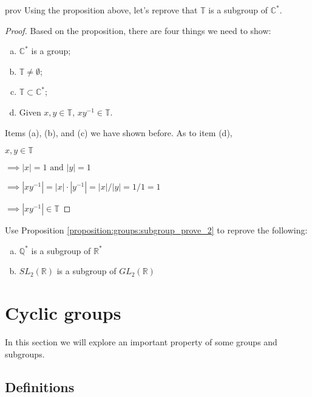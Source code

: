 \begin{example}{prov}
Using the proposition above, let's reprove that ${\mathbb T}$ is a subgroup of ${\mathbb C}^{\ast}$.

\begin{proof}
Based on the proposition, there are four things we need to show:
\begin{enumerate}[(a)]
\item
${\mathbb C}^{\ast}$ is a group; 
\item
${\mathbb T} \neq \emptyset$; 
\item
${\mathbb T} \subset {\mathbb C}^{\ast}$; 
\item
Given $x, y \in {\mathbb T}$, $xy^{-1} \in {\mathbb T}$.
\end{enumerate}

\noindent
Items (a), (b), and (c) we have shown before. As to item (d), 

$x, y \in {\mathbb T}$

$\implies |x|=1 \mbox{ and } |y|=1$

$\implies |xy^{-1}|= |x|\cdot|y^{-1}| = |x|/|y| = 1/1 = 1$

$\implies |xy^{-1}| \in {\mathbb T}$

\end{proof}
\end{example} 

\begin{exercise}{73}
Use Proposition \ref{proposition:groups:subgroup_prove_2} to reprove the following:
\begin{enumerate}[(a)]
\item
${\mathbb Q}^*$ is a subgroup of ${\mathbb R}^*$
\item
$SL_2( {\mathbb R})$ is a subgroup of $GL_2( {\mathbb R})$
\end{enumerate}
\end{exercise}

\section{Cyclic groups\quad
{}}\label{cyclic_groups}
 
In this section we will explore an important property of some groups and subgroups.  

\subsection{Definitions}\label{subsec:groups:cyclic_groups}

